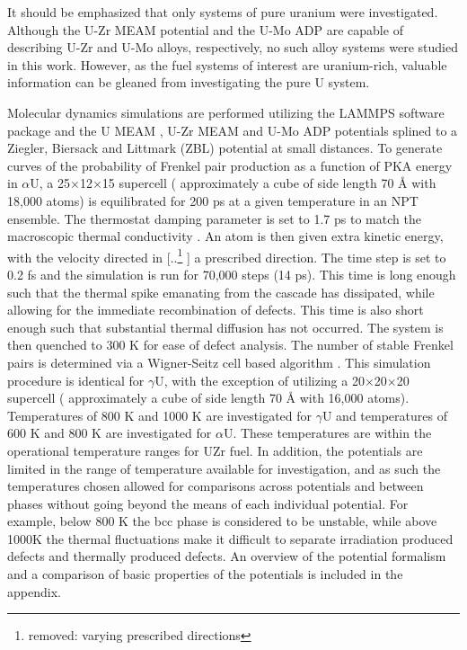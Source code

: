 \documentclass[review]{elsarticle}
\providecommand{\DIFaddtex}[1]{{\protect\color{blue} \sf #1}} %
\providecommand{\DIFdeltex}[1]{{\protect\color{red} [..\footnote{removed: #1} ]}} %
\providecommand{\DIFaddbegin}{} %
\providecommand{\DIFaddend}{} %
\providecommand{\DIFdelbegin}{} %
\providecommand{\DIFdelend}{} %
\providecommand{\DIFadd}[1]{\texorpdfstring{\DIFaddtex{#1}}{#1}} %
\providecommand{\DIFdel}[1]{\texorpdfstring{\DIFdeltex{#1}}{}} %
\newcommand{\DIFscaledelfig}{0.5}
\newlength{\DIFdelgraphicswidth} %
\newlength{\DIFdelgraphicsheight} %
\newcommand{\DIFaddincludegraphics}[2][]{{\color{blue}\fbox{\DIFOincludegraphics[#1]{#2}}}} %
\newcommand{\DIFdelincludegraphics}[2][]{%
\sbox{\DIFdelgraphicsbox}{\DIFOincludegraphics[#1]{#2}}%
\settoboxwidth{\DIFdelgraphicswidth}{\DIFdelgraphicsbox} %
\settoboxtotalheight{\DIFdelgraphicsheight}{\DIFdelgraphicsbox} %
\scalebox{\DIFscaledelfig}{%
\parbox[b]{\DIFdelgraphicswidth}{\usebox{\DIFdelgraphicsbox}\\[-\baselineskip] \rule{\DIFdelgraphicswidth}{0em}}\llap{\resizebox{\DIFdelgraphicswidth}{\DIFdelgraphicsheight}{%
\setlength{\unitlength}{\DIFdelgraphicswidth}%
\begin{picture}(1,1)%
\thicklines\linethickness{2pt} %
{\color[rgb]{1,0,0}\put(0,0){\framebox(1,1){}}}%
{\color[rgb]{1,0,0}\put(0,0){\line( 1,1){1}}}%
{\color[rgb]{1,0,0}\put(0,1){\line(1,-1){1}}}%
\end{picture}%
}\hspace*{3pt}}} %
} %
\DeclareRobustCommand{\DIFaddbegin}{\DIFOaddbegin \let\includegraphics\DIFaddincludegraphics} %
\DeclareRobustCommand{\DIFaddend}{\DIFOaddend \let\includegraphics\DIFOincludegraphics} %
\DeclareRobustCommand{\DIFdelbegin}{\DIFOdelbegin \let\includegraphics\DIFdelincludegraphics} %
\DeclareRobustCommand{\DIFdelend}{\DIFOaddend \let\includegraphics\DIFOincludegraphics} %
\begin{document}
\DIFaddbegin \DIFadd{It should be emphasized that only systems of pure uranium were investigated. Although the U-Zr MEAM potential and the U-Mo ADP are capable of describing U-Zr and U-Mo alloys, respectively, no such alloy systems were studied in this work. However, as the fuel systems of interest are uranium-rich, valuable information can be gleaned from investigating the pure U system.
}

\DIFaddend Molecular dynamics simulations are performed utilizing the LAMMPS \cite{plimpton1995} software package and the U MEAM \cite{beeler_meam}, U-Zr MEAM \cite{moore2015} and U-Mo ADP \cite{smirnovaADP} potentials splined to a Ziegler, Biersack and Littmark (ZBL) \cite{zbl} potential at small distances. To generate curves of the probability of Frenkel pair production as a function of PKA energy in $\alpha$U, a 25$\times$12$\times$15 supercell (\DIFaddbegin \DIFadd{approximately a cube of side length 70 }{\DIFadd{\AA}} \DIFadd{with }\DIFaddend 18,000 atoms) is equilibrated for 200 ps at a given temperature in an NPT ensemble. The thermostat damping parameter is set to 1.7 ps to match the macroscopic thermal conductivity \cite{lane2012}. An atom is then given extra kinetic energy, with the velocity directed in \DIFdelbegin \DIFdel{varying prescribed directions}\DIFdelend \DIFaddbegin \DIFadd{a prescribed direction}\DIFaddend . The time step is set to 0.2 fs and the simulation is run for 70,000 steps (14 ps). This time is long enough such that the thermal spike emanating from the cascade has dissipated, while allowing for the immediate recombination of defects. This time is also short enough such that substantial thermal diffusion has not occurred. The system is then quenched to 300 K for ease of defect analysis. The number of stable Frenkel pairs is determined via a Wigner-Seitz cell based algorithm \cite{hayward2010}. This simulation procedure is identical for $\gamma$U, with the exception of utilizing a 20$\times$20$\times$20 supercell (\DIFaddbegin \DIFadd{approximately a cube of side length 70 }{\DIFadd{\AA}} \DIFadd{with }\DIFaddend 16,000 atoms). \DIFaddbegin \DIFadd{Temperatures of 800 K and 1000 K are investigated for $\gamma$U and temperatures of 600 K and 800 K are investigated for $\alpha$U. These temperatures are within the operational temperature ranges for UZr fuel. In addition, the potentials are limited in the range of temperature available for investigation, and as such the temperatures chosen allowed for comparisons across potentials and between phases without going beyond the means of each individual potential. For example, below 800 K the bcc phase is considered to be unstable, while above 1000K the thermal fluctuations make it difficult to separate irradiation produced defects and thermally produced defects. An overview of the potential formalism and a comparison of basic properties of the potentials is included in the appendix.
}\DIFaddend 
\end{document}
